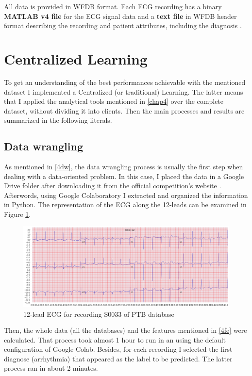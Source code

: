 All data is provided in WFDB format. Each ECG recording has a binary \textbf{MATLAB v4 file} for the ECG signal data and a \textbf{text file} in WFDB header format describing the recording and patient attributes, including the diagnosis \cite{dataset3} \cite{dataset2} \cite{dataset4}.

\section{Centralized Learning} \label{5CL}

To get an understanding of the best performances achievable with the mentioned dataset I implemented a Centralized (or traditional) Learning. The latter means that I applied the analytical tools mentioned in \ref{chap4} over the complete dataset, without dividing it into clients. Then the main processes and results are summarized in the following literals.

\subsection{Data wrangling}

As mentioned in \ref{4dw}, the data wrangling process is usually the first step when dealing with a data-oriented problem. In this case, I placed the data in a Google Drive folder after downloading it from the official competition's website \cite{dataset3}. Afterwords, using Google Colaboratory I extracted and organized the information in Python. The representation of the ECG along the 12-leads can be examined in Figure \ref{fig:ecg_example_S0033}.

\begin{figure}[H]
\centering
\includegraphics[scale=0.35]{img/ecg_example_S0033.png}
\caption{12-lead ECG for recording S0033 of PTB database}
\label{fig:ecg_example_S0033}
\end{figure}

Then, the whole data (all the databases) and the features mentioned in \ref{4fe} were calculated. That process took almost 1 hour to run in an using the default configuration of Google Colab. Besides, for each recording I selected the first diagnose (arrhythmia) that appeared as the label to be predicted. The latter process ran in about 2 minutes.

